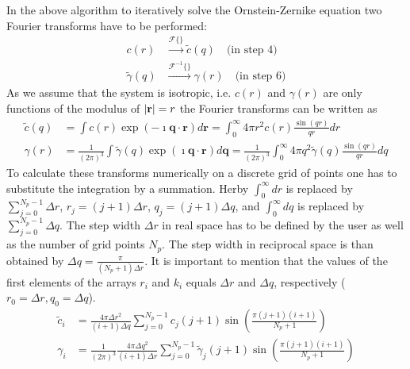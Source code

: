 
In the above algorithm to iteratively solve the Ornstein-Zernike
equation two Fourier transforms have to be performed:
\begin{align}
c(r) & \xrightarrow{\mathscr{F}\{\}} \tilde{c}(q)  \quad \mbox{(in step 4)} \\
\tilde{\gamma}(q) & \xrightarrow{\mathscr{F}^{-1}\{\}} \gamma(r) \quad \mbox{(in step 6)}
\end{align}
As we assume that the system is isotropic, i.e. $c(r)$ and $\gamma(r)$ are only functions
of the modulus of $\abs{\mathbf{r}}=r$ the Fourier transforms can be written as
\begin{align}
\tilde{c}(q) &= \int c(r) \exp\left(- \imath\mathbf{q}\cdot \mathbf{r} \right) d\mathbf{r}
              = \int_0^\infty 4\pi r^2 c(r)              \frac{\sin(qr)}{qr}  dr \\
\gamma(r)    &= \frac{1}{(2\pi)^3}
                \int \tilde{\gamma}(q) \exp\left(\imath\mathbf{q}\cdot \mathbf{r}\right) d\mathbf{q}
              = \frac{1}{(2\pi)^3}
                \int_0^\infty 4\pi q^2 \tilde{\gamma}(q) \frac{\sin(qr)}{qr}  dq
\end{align}
To calculate these transforms numerically on a discrete grid of points
one has to substitute the integration by a summation. Herby $\int_0^\infty dr$ is replaced by
$\sum_{j=0}^{N_p-1} \Delta r$, $r_j=(j+1)\Delta r$, $q_j=(j+1)\Delta q$, and $\int_0^\infty dq$ is replaced by
$\sum_{j=0}^{N_p-1} \Delta q$. The step width $\Delta r$ in real space has to be defined by the user as well
as the number of grid points $N_p$. The step width in reciprocal space is than obtained by
$\Delta q=\frac{\pi}{(N_p+1)\Delta r}$.
It is important to mention that the values of the first elements of the arrays $r_{i}$ and $k_{i}$ equals $\Delta r$
and $\Delta q$, respectively ($r_0=\Delta r, q_0=\Delta q$).
\begin{align}
\tilde{c}_i &=                   \frac{4\pi \Delta r^2}{(i+1)\Delta q} \sum_{j=0}^{N_p-1}              c_j (j+1) \sin\left(\frac{\pi(j+1)(i+1)}{N_p+1}\right) \\
\gamma_i    &= \frac{1}{(2\pi)^3}\frac{4\pi \Delta q^2}{(i+1)\Delta r} \sum_{j=0}^{N_p-1} \tilde{\gamma}_j (j+1) \sin\left(\frac{\pi(j+1)(i+1)}{N_p+1}\right)
\end{align}
